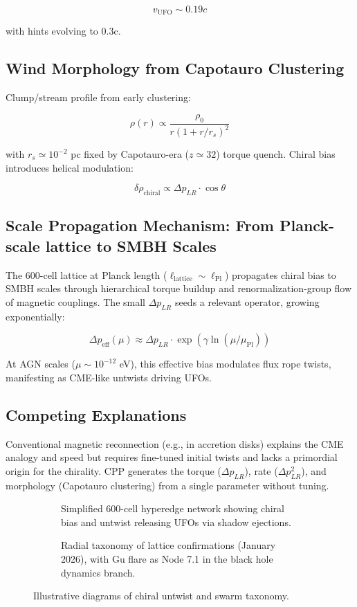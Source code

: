 \documentclass[11pt]{article}
\begin{document}
\[
v_{\text{UFO}} \sim 0.19 c
\]

with hints evolving to 0.3c.

\subsection{Wind Morphology from Capotauro Clustering}
Clump/stream profile from early clustering:

\[
\rho(r) \propto \frac{\rho_0}{r (1 + r/r_s)^2}
\]

with $r_s \simeq 10^{-2}$ pc fixed by Capotauro-era ($z \simeq 32$) torque quench. Chiral bias introduces helical modulation:

\[
\delta \rho_{\text{chiral}} \propto \Delta p_{LR} \cdot \cos\theta
\]

\subsection{Scale Propagation Mechanism: From Planck-scale lattice to SMBH Scales}
The 600-cell lattice at Planck length ($\ell_{\text{lattice}} \sim \ell_{\text{Pl}}$) propagates chiral bias to SMBH scales through hierarchical torque buildup and renormalization-group flow of magnetic couplings. The small $\Delta p_{LR}$ seeds a relevant operator, growing exponentially:

\[
\Delta p_{\text{eff}}(\mu) \approx \Delta p_{LR} \cdot \exp(\gamma \ln(\mu / \mu_{\text{Pl}}))
\]

At AGN scales ($\mu \sim 10^{-12}$ eV), this effective bias modulates flux rope twists, manifesting as CME-like untwists driving UFOs.

\subsection{Competing Explanations}
Conventional magnetic reconnection (e.g., in accretion disks) explains the CME analogy and speed but requires fine-tuned initial twists and lacks a primordial origin for the chirality. CPP generates the torque ($\Delta p_{LR}$), rate ($\Delta p_{LR}^2$), and morphology (Capotauro clustering) from a single parameter without tuning.

\begin{figure}[htbp]
\centering
\begin{subfigure}{0.45\textwidth}
\centering
\caption{Simplified 600-cell hyperedge network showing chiral bias and untwist releasing UFOs via shadow ejections.}
\label{fig:chiral-untwist}
\end{subfigure}
\hfill
\begin{subfigure}{0.45\textwidth}
\centering
\caption{Radial taxonomy of lattice confirmations (January 2026), with Gu flare as Node 7.1 in the black hole dynamics branch.}
\label{fig:taxonomy}
\end{subfigure}
\caption{Illustrative diagrams of chiral untwist and swarm taxonomy.}
\end{figure}
\end{document}
